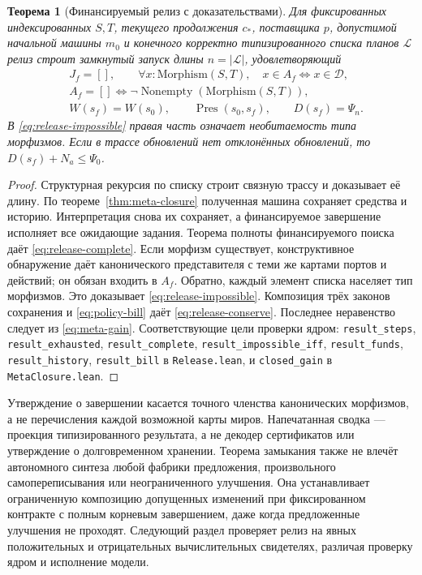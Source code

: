 \documentclass[10pt,a4paper]{article}
\newtheorem{theorem}{Теорема}[section]
\newcommand{\CanonRef}{\mathcal D}
\newcommand{\Pres}{\operatorname{Pres}}
\newcommand{\rc}[1]{\allowbreak\texttt{#1}\allowbreak}
\begin{document}
\begin{theorem}[Финансируемый релиз с доказательствами]\label{thm:release}
Для фиксированных индексированных $S,T$, текущего продолжения $c_*$, поставщика $p$, допустимой начальной машины $m_0$ и конечного корректно типизированного списка планов $\mathcal L$ релиз строит замкнутый запуск длины $n=|\mathcal L|$, удовлетворяющий
\begin{align}
 &J_f=[] ,\qquad \forall x:\mathrm{Morphism}(S,T),\quad x\in A_f\iff x\in\CanonRef,\label{eq:release-complete}\\
 &A_f=[]\iff \neg\operatorname{Nonempty}(\mathrm{Morphism}(S,T)),\label{eq:release-impossible}\\
 &W(s_f)=W(s_0),\qquad \Pres(s_0,s_f),\qquad D(s_f)=\Psi_n.\label{eq:release-conserve}
\end{align}
В \eqref{eq:release-impossible} правая часть означает необитаемость типа морфизмов. Если в трассе обновлений нет отклонённых обновлений, то $D(s_f)+N_a\le\Psi_0$.
\end{theorem}
\begin{proof}
Структурная рекурсия по списку строит связную трассу и доказывает её длину. По теореме~\ref{thm:meta-closure} полученная машина сохраняет средства и историю. Интерпретация снова их сохраняет, а финансируемое завершение исполняет все ожидающие задания. Теорема полноты финансируемого поиска даёт \eqref{eq:release-complete}. Если морфизм существует, конструктивное обнаружение даёт канонического представителя с теми же картами портов и действий; он обязан входить в $A_f$. Обратно, каждый элемент списка населяет тип морфизмов. Это доказывает \eqref{eq:release-impossible}. Композиция трёх законов сохранения и \eqref{eq:policy-bill} даёт \eqref{eq:release-conserve}. Последнее неравенство следует из \eqref{eq:meta-gain}. Соответствующие цели проверки ядром: \rc{result\_steps}, \rc{result\_exhausted}, \rc{result\_complete}, \rc{result\_impossible\_iff}, \rc{result\_funds}, \rc{result\_history}, \rc{result\_bill} в \rc{Release.lean}, и \rc{closed\_gain} в \rc{MetaClosure.lean}.
\end{proof}

Утверждение о завершении касается точного членства канонических морфизмов, а не перечисления каждой возможной карты миров. Напечатанная сводка --- проекция типизированного результата, а не декодер сертификатов или утверждение о долговременном хранении. Теорема замыкания также не влечёт автономного синтеза любой фабрики предложения, произвольного самопереписывания или неограниченного улучшения. Она устанавливает ограниченную композицию допущенных изменений при фиксированном контракте с полным корневым завершением, даже когда предложенные улучшения не проходят. Следующий раздел проверяет релиз на явных положительных и отрицательных вычислительных свидетелях, различая проверку ядром и исполнение модели.
\clearpage
\end{document}
